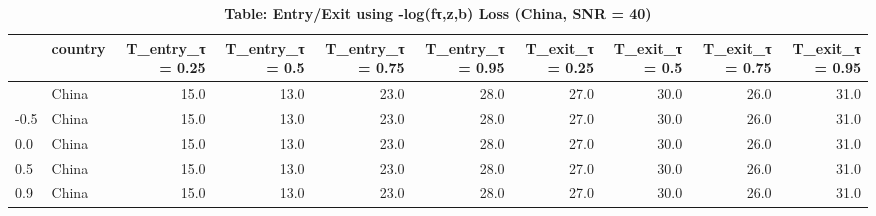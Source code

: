 \begin{table}[t]
\caption*{
{\large \textbf{Table: Entry/Exit using -log(fτ,z,b) Loss (China, SNR = 40)}}
} 
\begin{tabular*}{\linewidth}{@{\extracolsep{\fill}}l|lrrrrrrrr}
\toprule
 & country & T\_entry\_τ = 0.25 & T\_entry\_τ = 0.5 & T\_entry\_τ = 0.75 & T\_entry\_τ = 0.95 & T\_exit\_τ = 0.25 & T\_exit\_τ = 0.5 & T\_exit\_τ = 0.75 & T\_exit\_τ = 0.95 \\ 
\midrule\addlinespace[2.5pt]
-0.9 & China & 15.0 & 13.0 & 23.0 & 28.0 & 27.0 & 30.0 & 26.0 & 31.0 \\ 
-0.5 & China & 15.0 & 13.0 & 23.0 & 28.0 & 27.0 & 30.0 & 26.0 & 31.0 \\ 
0.0 & China & 15.0 & 13.0 & 23.0 & 28.0 & 27.0 & 30.0 & 26.0 & 31.0 \\ 
0.5 & China & 15.0 & 13.0 & 23.0 & 28.0 & 27.0 & 30.0 & 26.0 & 31.0 \\ 
0.9 & China & 15.0 & 13.0 & 23.0 & 28.0 & 27.0 & 30.0 & 26.0 & 31.0 \\ 
\bottomrule
\end{tabular*}
\end{table}

